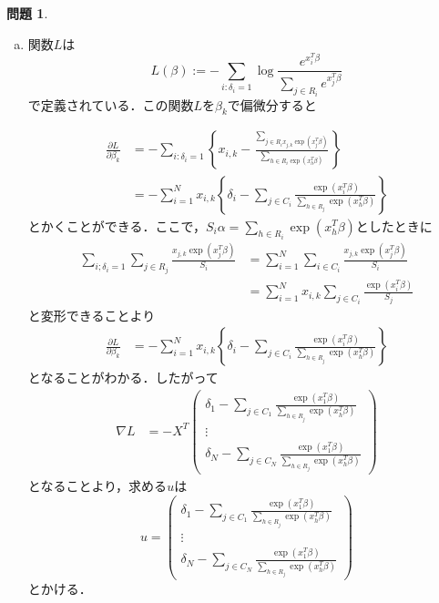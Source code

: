 \documentclass{jsarticle}
\theoremstyle{definition}
\newtheorem{Ex}{問題}
\theoremstyle{mystyle} %
\begin{document}
\begin{Ex}
  \begin{enumerate}[(a)]

\item 関数$L$は
$$L(\beta) := -\sum_{i:\delta_i = 1}\log \frac{e^{x_i^T \beta}}{\sum_{j\in R_i}e^{x_j^T \beta}}$$
で定義されている．この関数$L$を$\beta_k$で偏微分すると

\begin{align*}
  \frac{\partial L}{\partial \beta_k}&=-\sum_{i:\delta_i = 1}\left\{x_{i,k}-\frac{\sum_{j\in R_i x_{j,k}\exp(x_j^T \beta)}}{\sum_{h\in R_i\exp(x_h^T \beta) }}\right\}\\
  &=-\sum_{i=1}^N x_{i,k}\left\{
    \delta_i - \sum_{j\in C_i}\frac{\exp(x_i^T \beta)}{\sum_{h\in R_j}\exp(x_h^T \beta)}
  \right\}
\end{align*}
とかくことができる．ここで，$S_i\alpha= \sum_{h\in R_i}\exp(x_h^T \beta)$としたときに
\begin{align*}
\sum_{i;\delta_i=1}\sum_{j\in R_j}\frac{x_{j,k}\exp(x_j^T \beta)}{S_i}&= \sum_{i=1}^N\sum_{i\in C_i}\frac{x_{j,k}\exp(x_j^T \beta)}{S_i}\\
&=\sum_{i=1}^N x_{i,k}\sum_{j\in C_i}\frac{\exp(x_i^T \beta)}{S_j}
\end{align*}
と変形できることより
\begin{align*}
  \frac{\partial L}{\partial \beta_k}&=
  -\sum_{i=1}^N x_{i,k}\left\{\delta_i - \sum_{j\in C_i}\frac{\exp(x_i^T \beta)}{\sum_{h\in R_j}\exp(x_h^T \beta)}\right\}
\end{align*}
となることがわかる．したがって
\begin{align*}
  \nabla L&=-X^T \left(\begin{array}{c}
    \delta_1- \sum_{j\in C_1}\frac{\exp(x_1^T \beta)}{\sum_{h\in R_j}\exp(x_h^T \beta)}\\
    \vdots \\
    \delta_N- \sum_{j\in C_N}\frac{\exp(x_1^T \beta)}{\sum_{h\in R_j}\exp(x_h^T \beta)}
  \end{array}\right)
\end{align*}
となることより，求める$u$は
$$u=\left(\begin{array}{c}
  \delta_1- \sum_{j\in C_1}\frac{\exp(x_1^T \beta)}{\sum_{h\in R_j}\exp(x_h^T \beta)}\\
  \vdots \\
  \delta_N- \sum_{j\in C_N}\frac{\exp(x_1^T \beta)}{\sum_{h\in R_j}\exp(x_h^T \beta)}
\end{array}\right)$$
とかける．\\


\end{enumerate}
\end{Ex}
\end{document}
